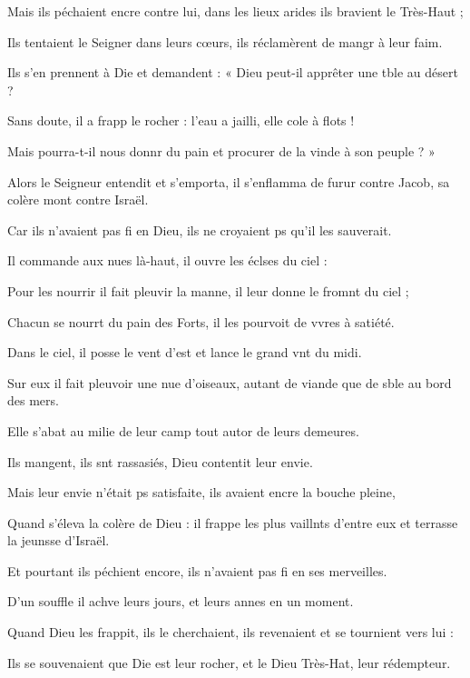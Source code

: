 \item Mais ils péchaient encre contre lui, dans les lieux arides ils bravient le Très-Haut ;
\item Ils tentaient le Seigner dans leurs cœurs, ils réclamèrent de mangr à leur faim.
\item Ils s’en prennent à Die et demandent : « Dieu peut-il apprêter une tble au désert ?
\item Sans doute, il a frapp le rocher : l’eau a jailli, elle cole à flots ! 
\item Mais pourra-t-il nous donnr du pain et procurer de la vinde à son peuple ? »
\item Alors le Seigneur entendit et s’emporta, il s’enflamma de furur contre Jacob, sa colère mont contre Israël.
\item Car ils n’avaient pas fi en Dieu, ils ne croyaient ps qu’il les sauverait.
\item Il commande aux nues là-haut, il ouvre les éclses du ciel :
\item Pour les nourrir il fait pleuvir la manne, il leur donne le fromnt du ciel ;
\item Chacun se nourrt du pain des Forts, il les pourvoit de vvres à satiété.
\item Dans le ciel, il posse le vent d’est et lance le grand vnt du midi.
\item Sur eux il fait pleuvoir une nue d’oiseaux, autant de viande que de sble au bord des mers.
\item Elle s’abat au milie de leur camp tout autor de leurs demeures.
\item Ils mangent, ils snt rassasiés, Dieu contentit leur envie.
\item Mais leur envie n’était ps satisfaite, ils avaient encre la bouche pleine,
\item Quand s’éleva la colère de Dieu : il frappe les plus vaillnts d’entre eux et terrasse la jeunsse d’Israël.
\item Et pourtant ils péchient encore, ils n’avaient pas fi en ses merveilles.
\item D’un souffle il achve leurs jours, et leurs annes en un moment.
\item Quand Dieu les frappit, ils le cherchaient, ils revenaient et se tournient vers lui :
\item Ils se souvenaient que Die est leur rocher, et le Dieu Très-Hat, leur rédempteur.
